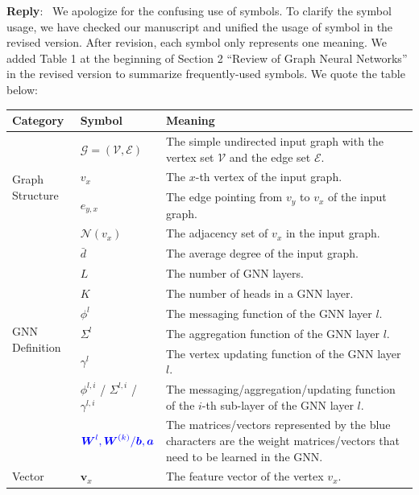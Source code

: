 \documentclass[12pt]{article}
\newcounter{reviewer}
\newcounter{point}[reviewer]
\newenvironment{reply}
   {\medskip \noindent \textbf{Reply}:\  }
   {\medskip}
\begin{document}
\begin{reply}
    We apologize for the confusing use of symbols.
    To clarify the symbol usage, we have checked our manuscript and unified the usage of symbol in the revised version.
    After revision, each symbol only represents one meaning.
    We added Table 1 at the beginning of Section 2 ``Review of Graph Neural Networks'' in the revised version to summarize frequently-used symbols.
    We quote the table below:
    \begin{table}[H]
        \footnotesize
        \centering
        \begin{tabular}{p{3em}lp{35em}}
            \toprule
            Category & Symbol & Meaning \\
            \midrule
            \multirow[c]{4}{3em}{Graph Structure}& $\mathcal{G}=(\mathcal{V}, \mathcal{E})$ & The simple undirected input graph with the vertex set $\mathcal{V}$ and the edge set $\mathcal{E}$. \\
            & $v_x$ & The $x$-th vertex of the input graph. \\
            & $e_{y,x}$ & The edge pointing from $v_y$ to $v_x$ of the input graph. \\
            & $\mathcal{N}(v_x)$ & The adjacency set of $v_x$ in the input graph. \\ 
            & $\bar{d}$ & The average degree of the input graph. \\ \midrule
            \multirow[c]{6}{3em}{GNN Definition}& $L$ & The number of GNN layers. \\
            & $K$ & The number of heads in a GNN layer. \\
            & $\phi^l$ & The messaging function of the GNN layer $l$. \\
            & $\Sigma^l$ & The aggregation function of the GNN layer $l$. \\
            & $\gamma^l$ & The vertex updating function of the GNN layer $l$. \\ 
            & $\phi^{l,i}$ / $\Sigma^{l,i}$ / $\gamma^{l,i}$ & The messaging/aggregation/updating function of the $i$-th sub-layer of the GNN layer  $l$.\\
            & $\textcolor{blue}{\boldsymbol{W}^l, \boldsymbol{W}^{(k)}/\boldsymbol{b}, \boldsymbol{a}}$ & The matrices/vectors represented by the blue characters are the weight matrices/vectors that need to be learned in the GNN. \\  \midrule
            \multirow[c]{8}{3em}{Vector}& $\boldsymbol{v}_x$ & The feature vector of the vertex $v_x$. \\

\end{tabular}
\end{table}
\end{reply}
\end{document}
